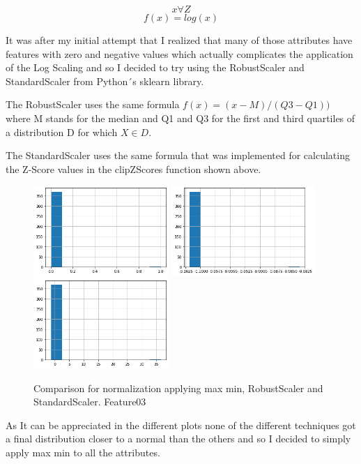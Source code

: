 \documentclass[12pt, a4paper]{article}
\begin{document}
	\[ x \forall Z \]
	\[ f(x) = log(x) \]
	
	It was after my initial attempt that I realized that many of those attributes have features with zero and negative values which actually complicates the application of the Log Scaling and so I decided to try using the RobustScaler and StandardScaler from Python´s sklearn library.
	
	The RobustScaler uses the same formula $f(x) = (x - M)/(Q3-Q1)) $ where M stands for the median and Q1 and Q3 for the first and third quartiles of a distribution D for which $X \in D$.\cite{normalizeSkLearn}
	
	The StandardScaler uses the same formula that was implemented for calculating the Z-Score values in the clipZScores function shown above.
	
	\begin{figure}[H]
		\label{Feature03Comparidson}
		\includegraphics[height=34mm]{img/plots/feature03N.png}
		\includegraphics[height=34mm]{img/plots/feature03NStandard.png}
		\includegraphics[height=34mm]{img/plots/feature03NRobust.png}
		\caption[width=50mm]{Comparison for normalization applying max min, RobustScaler and StandardScaler. Feature03}
	\end{figure}

	As It can be appreciated in the different plots none of the different techniques got a final distribution closer to a normal than the others and so I decided to simply apply max min to all the attributes.
	
\end{document}
